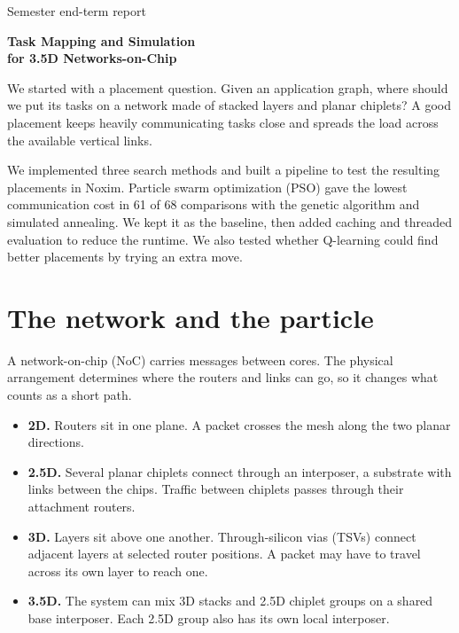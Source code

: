 \documentclass[12pt,a4paper]{article}
\begin{document}
\thispagestyle{empty}
\vspace*{8mm}
{\large\sffamily\color{Muted}Semester end-term report\par}
\vspace{5mm}
{\sffamily\bfseries\color{Heading}\fontsize{29}{34}\selectfont
Task Mapping and Simulation\\
for 3.5D Networks-on-Chip\par}
\vspace{6mm}

We started with a placement question. Given an application graph, where should we put its tasks on a network made of stacked layers and planar chiplets? A good placement keeps heavily communicating tasks close and spreads the load across the available vertical links.

We implemented three search methods and built a pipeline to test the resulting placements in Noxim. Particle swarm optimization (PSO) gave the lowest communication cost in 61 of 68 comparisons with the genetic algorithm and simulated annealing. We kept it as the baseline, then added caching and threaded evaluation to reduce the runtime. We also tested whether Q-learning could find better placements by trying an extra move.

\vspace{3mm}
\tableofcontents

\clearpage
\section{The network and the particle}

A network-on-chip (NoC) carries messages between cores. The physical arrangement determines where the routers and links can go, so it changes what counts as a short path.

\begin{itemize}
\setlength{\itemsep}{2pt}
\item \textbf{2D.} Routers sit in one plane. A packet crosses the mesh along the two planar directions.
\item \textbf{2.5D.} Several planar chiplets connect through an interposer, a substrate with links between the chips. Traffic between chiplets passes through their attachment routers.
\item \textbf{3D.} Layers sit above one another. Through-silicon vias (TSVs) connect adjacent layers at selected router positions. A packet may have to travel across its own layer to reach one.
\item \textbf{3.5D.} The system can mix 3D stacks and 2.5D chiplet groups on a shared base interposer. Each 2.5D group also has its own local interposer.
\end{itemize}
\end{document}
